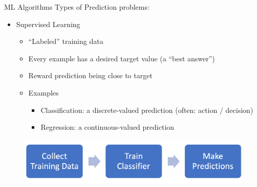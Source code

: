 \documentclass{beamer}
\begin{document}
\begin{frame}[allowframebreaks]{ML Algorithms}
Types of Prediction problems:
\begin{itemize}
\item Supervised Learning
\begin{itemize}
    \item “Labeled” training data
    \item Every example has a desired target value (a “best answer”)
    \item Reward prediction being close to target
    \item[] Examples
    \begin{itemize}
    \item Classification: a discrete-valued prediction (often: action / decision)
    \item Regression: a continuous-valued prediction
    \end{itemize}
\end{itemize}
\end{itemize}

\begin{figure}
\centering
\captionsetup{justification=centering}
\includegraphics[scale=0.45]{SupervisedLearning.png}
\end{figure}

\framebreak

\end{frame}
\end{document}
